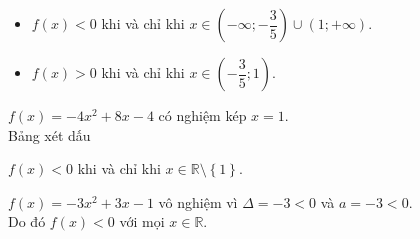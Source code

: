 \begin{baitap}
{\begin{enumEX}[a)]{1}
\begin{center}
\begin{tikzpicture}
				\end{tikzpicture}
			\end{center}
			\begin{itemize}
				\item $f(x)<0$ khi và chỉ khi $x\in\left(-\infty;-\dfrac{3}{5}\right)\cup(1;+\infty)$.
				\item $f(x)>0$ khi và chỉ khi $x\in\left(-\dfrac{3}{5};1\right)$.
			\end{itemize}
			\item $f(x)=-4x^2+8x-4$ có nghiệm kép $x=1$.\\
			Bảng xét dấu
			\begin{center}
			\end{center}
			$f(x)<0$ khi và chỉ khi $x\in\mathbb{R}\setminus\left\{1\right\}$.
			\item $f(x)=-3x^2+3x-1$ vô nghiệm vì $\Delta=-3<0$ và $a=-3<0$.\\
			Do đó $f(x)<0$ với mọi $x\in\mathbb{R}$.
		\end{enumEX}
	}
\end{baitap}


